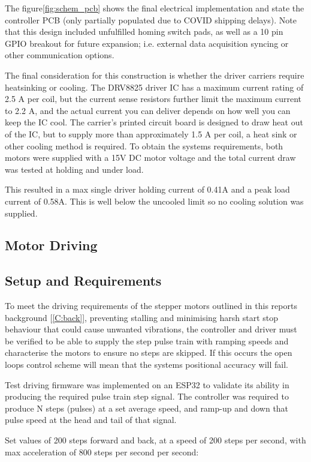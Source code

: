 The figure\ref{fig:schem_pcb} shows the final electrical implementation and state the controller PCB (only partially populated due to COVID shipping delays). Note that this design included unfulfilled homing switch pads, as well as a 10 pin GPIO breakout for future expansion; i.e. external data acquisition syncing or other communication options.

The final consideration for this construction is whether the driver carriers require heatsinking or cooling. The DRV8825 driver IC has a maximum current rating of 2.5 A per coil, but the current sense resistors further limit the maximum current to 2.2 A, and the actual current you can deliver depends on how well you can keep the IC cool. The carrier’s printed circuit board is designed to draw heat out of the IC, but to supply more than approximately 1.5 A per coil, a heat sink or other cooling method is required. To obtain the systems requirements, both motors were supplied with a 15V DC motor voltage and the total current draw was tested at holding and under load.

This resulted in a max single driver holding current of 0.41A and a peak load current of 0.58A. 
This is well below the uncooled limit so no cooling solution was supplied.


\subsection{Motor Driving}
\subsection{Setup and Requirements}
To meet the driving requirements of the stepper motors outlined in this reports background [\ref{C:back}], preventing stalling and minimising harsh start stop behaviour that could cause unwanted vibrations, the controller and driver must be verified to be able to supply the step pulse train with ramping speeds and characterise the motors to ensure no steps are skipped. If this occurs the open loops control scheme will mean that the systems positional accuracy will fail.  

Test driving firmware was implemented on an ESP32 to validate its ability in producing the required pulse train step signal. The controller was required to produce N steps (pulses) at a set average speed, and ramp-up and down that pulse speed at the head and tail of that signal.

Set values of 200 steps forward and back, at a speed of 200 steps per second, with max acceleration of 800 steps per second per second:

